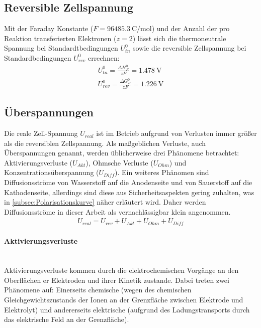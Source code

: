 \subsection{Reversible Zellspannung}
\label{subsec:rev Zellspannung}
Mit der Faraday Konstante ($F=\SI{96485,3}{\coulomb\per\mol}$) und der Anzahl der pro Reaktion transferierten Elektronen ($z = 2$) lässt sich die thermoneutrale Spannung bei Standardtbedingungen $U^0_{tn}$ sowie die reversible Zellspannung bei Standardbedingungen $U^0_{rev}$ errechnen:
\begin{align}
 U^0_{tn} = \frac{\Delta H^0_R}{zF} = \SI{1,478}{\volt}\\
 U^0_{rev} = \frac{\Delta G^0_R}{zF} = \SI{1,226}{\volt}
\end{align}

\subsection{Überspannungen}
\label{subsec:Überspannungen}
Die reale Zell-Spannung $U_{real}$ ist im Betrieb aufgrund von Verlusten immer größer als die reversiblen Zellspannung. Als maßgeblichen Verluste, auch Überspannungen genannt, werden üblicherweise drei Phänomene betrachtet: Aktivierungsverluste ($U_{Akt}$), Ohmsche Verluste ($U_{Ohm}$) und Konzentrationsüberspannung ($U_{Diff}$)\cite{guideline}. Ein weiteres Phänomen sind Diffusionsströme von Wasserstoff auf die Anodenseite und von Sauerstoff auf die Kathodenseite, allerdings sind diese aus Sicherheitsaspekten gering zuhalten, was in \ref{subsec:Polarisationskurve} näher erläutert wird. Daher werden Diffusionsströme in dieser Arbeit als vernachlässigbar klein angenommen. 
\begin{align}
	\label{gl:U_real}
	U_{real} =  U_{rev} + U_{Akt} + U_{Ohm} + U_{Diff}
\end{align}   
\paragraph{Aktivierungsverluste} \ \\
Aktivierungsverluste kommen durch die elektrochemischen Vorgänge an den Oberflächen er Elektroden und ihrer Kinetik zustande. Dabei treten zwei Phänomene auf:  Einerseits chemische (wegen des chemischen Gleichgewichtszustands der Ionen an der Grenzfläche zwischen Elektrode und Elektrolyt) und andererseits elektrische (aufgrund des Ladungstransports durch das elektrische Feld an der Grenzfläche)\cite{Solid Oxide Electrolyzer Cell Modeling: A Review}.\\

